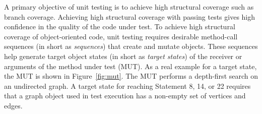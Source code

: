\documentclass{sig-alternate}
\begin{document}
A primary objective of unit testing is to achieve high structural coverage such as branch coverage. Achieving high structural coverage with passing tests gives high confidence in the quality of the code under test. To achieve high structural coverage of object-oriented code, unit testing requires desirable method-call sequences (in short as \emph{sequences})  that create and mutate objects. These sequences help generate target object states (in short as \emph{target states}) of the receiver or arguments of the method under test (MUT). As a real example for a target state, the  MUT is shown in Figure~\ref{fig:mut}. The MUT performs a depth-first search on an undirected graph. A target state for reaching Statement 8, 14, or 22 requires that a graph object used in test execution has a non-empty set of vertices and edges. 
\end{document}
